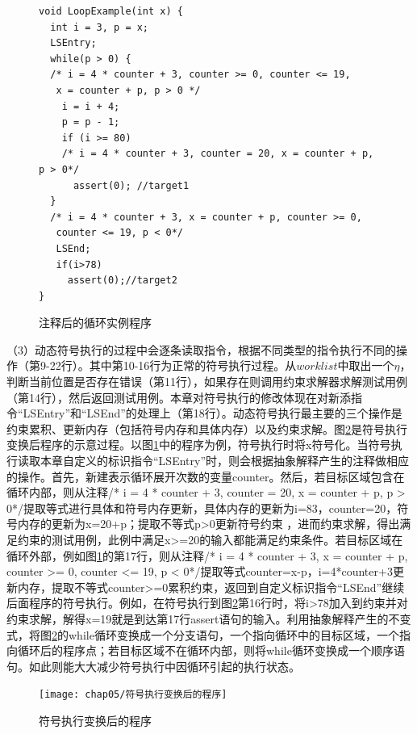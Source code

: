 \begin{figure}[h]
\begin{lstlisting}
void LoopExample(int x) {
  int i = 3, p = x;
  LSEntry;
  while(p > 0) {
  /* i = 4 * counter + 3, counter >= 0, counter <= 19,
   x = counter + p, p > 0 */
    i = i + 4;
    p = p - 1;
	if (i >= 80)
	/* i = 4 * counter + 3, counter = 20, x = counter + p, p > 0*/
	  assert(0); //target1
  }
  /* i = 4 * counter + 3, x = counter + p, counter >= 0, 
   counter <= 19, p < 0*/
   LSEnd;
   if(i>78)
     assert(0);//target2
}
\end{lstlisting}
\caption{注释后的循环实例程序}
\label{fig-example3}
\end{figure}

（3）动态符号执行的过程中会逐条读取指令，根据不同类型的指令执行不同的操作（第9-22行）。其中第10-16行为正常的符号执行过程。从$worklist$中取出一个$\eta$，判断当前位置是否存在错误（第11行），如果存在则调用约束求解器求解测试用例（第14行），然后返回测试用例。本章对符号执行的修改体现在对新添指令“LSEntry”和“LSEnd”的处理上（第18行）。动态符号执行最主要的三个操作是约束累积、更新内存（包括符号内存和具体内存）以及约束求解。图\ref{符号执行变换后的程序}是符号执行变换后程序的示意过程。以图\ref{fig-example3}中的程序为例，符号执行时将x符号化。当符号执行读取本章自定义的标识指令“LSEntry”时，则会根据抽象解释产生的注释做相应的操作。首先，新建表示循环展开次数的变量counter。然后，若目标区域包含在循环内部，则从注释/* i = 4 * counter + 3, counter = 20, x = counter + p, p > 0*/提取等式进行具体和符号内存更新，具体内存的更新为i=83，counter=20，符号内存的更新为x=20+p；提取不等式p>0更新符号约束
，进而约束求解，得出满足约束的测试用例，此例中满足x>=20的输入都能满足约束条件。若目标区域在循环外部，例如图\ref{fig-example3}的第17行，则从注释/* i = 4 * counter + 3, x = counter + p, counter >= 0, 
   counter <= 19, p < 0*/提取等式counter=x-p，i=4*counter+3更新内存，提取不等式counter>=0累积约束，返回到自定义标识指令“LSEnd”继续后面程序的符号执行。例如，在符号执行到图\ref{符号执行变换后的程序}第16行时，将i>78加入到约束并对约束求解，解得x=19就是到达第17行assert语句的输入。利用抽象解释产生的不变式，将图\ref{符号执行变换后的程序}的while循环变换成一个分支语句，一个指向循环中的目标区域，一个指向循环后的程序点；若目标区域不在循环内部，则将while循环变换成一个顺序语句。如此则能大大减少符号执行中因循环引起的执行状态。

\begin{figure}[htb]
\begin{center}
\texttt{[image: chap05/符号执行变换后的程序]}
\end{center}
\caption{符号执行变换后的程序}
\label{符号执行变换后的程序}
\end{figure}

